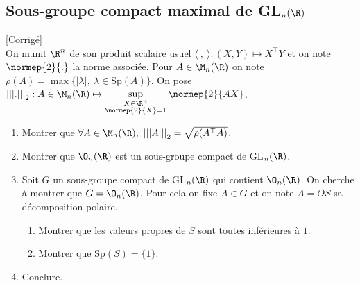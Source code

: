 \documentclass[8pt]{book}
\begin{document}
\subsection{Sous-groupe compact maximal de GL$_n(\R)$ }
\label{Sous-groupe compact maximal de GLn(R)}
\textcolor{blue}{\hyperref[Sous-groupe compact maximal de GLn(R) corrigé]{[Corrigé]}}\\
On munit $\R^n$ de son produit scalaire usuel $\langle\ ,\ \rangle:(X,Y)\mapsto X^\top Y$ et on note $\normep{2}{.}$ la norme associée. Pour $A\in \M_n(\R)$ on note $\rho(A)=\max\{|\lambda|,\ \lambda\in \text{Sp}(A)\}$. On pose ${|||.|||}_2:A\in \M_n(\R)\mapsto \sup\limits_{\substack{X\in \R^n\\\normep{2}{X}=1}}\normep{2}{AX}$.
\begin{enumerate}
	\item Montrer que $\forall A\in \M_n(\R),\ {|||A|||}_2=\sqrt{\rho(A^\top A)}$.
	\item Montrer que $\O_n(\R)$ est un sous-groupe compact de GL$_n(\R)$.
	\item Soit $G$ un sous-groupe compact de GL$_n(\R)$ qui contient $\O_n(\R)$. On cherche à montrer que $G=\O_n(\R)$. Pour cela on fixe $A\in G$ et on note $A=OS$ sa décomposition polaire.
	\begin{enumerate}[label=\alph*.]
		\item Montrer que les valeurs propres de $S$ sont toutes inférieures à $1$.
		\item Montrer que $\text{Sp}(S)=\{1\}$.
	\end{enumerate}
	\item Conclure.
\end{enumerate}
\end{document}
